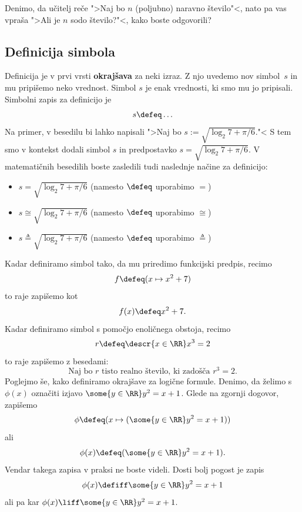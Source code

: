 \begin{vaja}
  Denimo, da učitelj reče ">Naj bo $n$ (poljubno) naravno število"<, nato pa vas vpraša ">Ali je $n$ sodo število?"<, kako boste odgovorili?
\end{vaja}

\subsection{Definicija simbola}

Definicija je v prvi vrsti \textbf{okrajšava} za neki izraz. Z njo uvedemo nov simbol~$s$ in mu pripišemo neko vrednost. Simbol $s$ je enak vrednosti, ki smo mu jo pripisali. Simbolni zapis za definicijo je
%
\begin{equation*}
  s \defeq \ldots
\end{equation*}
%
Na primer, v besedilu bi lahko napisali ">Naj bo $s := \sqrt{\log_2 7 + \pi/6}$."< S tem smo v kontekst dodali simbol $s$ in predpostavko $s = \sqrt{\log_2 7 + \pi/6}$. V matematičnih besedilih boste zasledili tudi naslednje načine za definicijo:
%
\begin{itemize}
\item $s = \sqrt{\log_2 7 + \pi/6}$ (namesto $\defeq$ uporabimo $=$)
\item $s \cong \sqrt{\log_2 7 + \pi/6}$ (namesto $\defeq$ uporabimo $\cong$)
\item $s \triangleq \sqrt{\log_2 7 + \pi/6}$ (namesto $\defeq$ uporabimo $\triangleq$)
\end{itemize}
%
Kadar definiramo simbol tako, da mu priredimo funkcijski predpis, recimo
%
\begin{equation*}
  f \defeq (x \mapsto x^2 + 7)
\end{equation*}
%
to raje zapišemo kot
%
\begin{equation*}
  f(x) \defeq x^2 + 7.
\end{equation*}
%
Kadar definiramo simbol s pomočjo enoličnega obstoja, recimo
%
\begin{equation*}
  r \defeq \descr{x \in \RR} x^3 = 2
\end{equation*}
%
to raje zapišemo z besedami:
%
\begin{equation*}
  \text{Naj bo $r$ tisto realno število, ki zadošča $r^3 = 2$.}
\end{equation*}
%
Poglejmo še, kako definiramo okrajšave za logične formule. Denimo, da želimo s $\phi(x)$ označiti izjavo $\some{y \in \RR} y^2 = x + 1$. Glede na zgornji dogovor, zapišemo
%
\begin{equation*}
  \phi \defeq (x \mapsto (\some{y \in \RR} y^2 = x + 1))
\end{equation*}
%
ali
%
\begin{equation*}
  \phi(x) \defeq (\some{y \in \RR} y^2 = x + 1).
\end{equation*}
%
Vendar takega zapisa v praksi ne boste videli. Dosti bolj pogost je zapis
%
\begin{equation*}
  \phi(x) \defiff \some{y \in \RR} y^2 = x + 1
\end{equation*}
%
ali pa kar $\phi(x) \liff \some{y \in \RR} y^2 = x + 1$.

